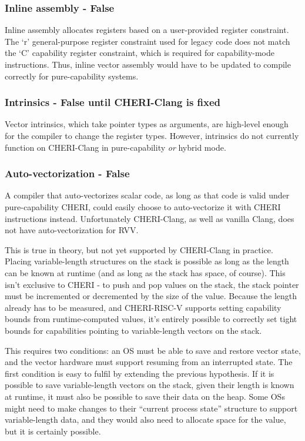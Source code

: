 \subsubsection*{Inline assembly - False}
Inline assembly allocates registers based on a user-provided register constraint.
The `r' general-purpose register constraint used for legacy code does not match the `C' capability register constraint, which is required for capability-mode instructions.
Thus, inline vector assembly would have to be updated to compile correctly for pure-capability systems.

\subsubsection*{Intrinsics - False until CHERI-Clang is fixed}
Vector intrinsics, which take pointer types as arguments, are high-level enough for the compiler to change the register types.
However, intrinsics do not currently function on CHERI-Clang in pure-capability \emph{or} hybrid mode.

\subsubsection*{Auto-vectorization - False}
A compiler that auto-vectorizes scalar code, as long as that code is valid under pure-capability CHERI, could easily choose to auto-vectorize it with CHERI instructions instead.
Unfortunately CHERI-Clang, as well as vanilla Clang, does not have auto-vectorization for RVV.

This is true in theory, but not yet supported by CHERI-Clang in practice.
Placing variable-length structures on the stack is possible as long as the length can be known at runtime (and as long as the stack has space, of course).
This isn't exclusive to CHERI - to push and pop values on the stack, the stack pointer must be incremented or decremented by the size of the value.
Because the length already has to be measured, and CHERI-RISC-V supports setting capability bounds from runtime-computed values, it's entirely possible to correctly set tight bounds for capabilities pointing to variable-length vectors on the stack.

This requires two conditions: an OS must be able to save and restore vector state, and the vector hardware must support resuming from an interrupted state.
The first condition is easy to fulfil by extending the previous hypothesis. 
If it is possible to save variable-length vectors on the stack, given their length is known at runtime, it must also be possible to save their data on the heap.
Some OSs might need to make changes to their ``current process state'' structure to support variable-length data, and they would also need to allocate space for the  value, but it is certainly possible.

